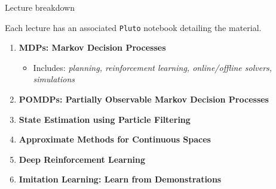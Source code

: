 
\begin{frame}[fragile]{Lecture breakdown}

\begin{highlightblock}
Each lecture has an associated \texttt{Pluto} notebook detailing the material.
\end{highlightblock}

\phantom{}

\begin{enumerate}
    \item \textbf{MDPs: Markov Decision Processes}
    \begin{itemize}
        \item Includes: \textit{planning, reinforcement learning, online/offline solvers, simulations}
    \end{itemize}
    \item \textbf{POMDPs: Partially Observable Markov Decision Processes}
    \item \textbf{State Estimation using Particle Filtering}
    \item \textbf{Approximate Methods for Continuous Spaces}
    \item \textbf{Deep Reinforcement Learning}
    \item \textbf{Imitation Learning: Learn from Demonstrations}
\end{enumerate}


\end{frame}